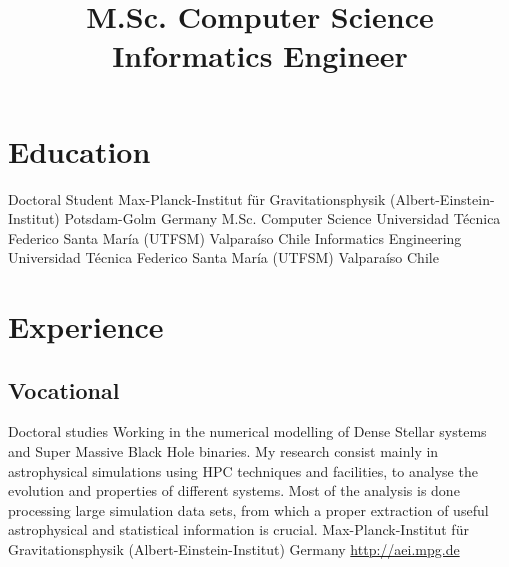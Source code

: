 \documentclass[12pt,a4paper]{moderncv}
\title{\Large M.Sc. Computer Science\newline
Informatics Engineer}
\newcommand{\utfsm}{Universidad Técnica Federico Santa María (UTFSM)}
\newcommand{\gray}{\textcolor{gray}}
\newcommand{\myurl}[1]{\gray{\url{#1}}}
\newcommand{\aei}{Max-Planck-Institut für Gravitationsphysik (Albert-Einstein-Institut)}
\newcommand{\cc}{\textcolor{color1}}
\begin{document}
\maketitle

\section{\LARGE Education}

\cventry{\cc{\textbf{2013 to\\ present}}}
        {Doctoral Student}
        {\aei}
        {}
        {Potsdam-Golm}
        {Germany}
        {M.Sc. Computer Science}
        {{\utfsm}}
        {}
        {Valparaíso}
        {Chile}
        {Informatics Engineering}
        {{\utfsm}}
        {}
        {Valparaíso}
        {Chile}


\section{\LARGE Experience}
\subsection{\Large Vocational}
\vspace{0.3cm}

        {Doctoral studies}
        {Working in the numerical modelling of \cc{Dense Stellar systems}
        and \cc{Super Massive Black Hole} binaries.\newline
        My research consist mainly in astrophysical simulations using \cc{HPC}
        techniques and facilities, to analyse the evolution and properties
        of different systems.\newline
        Most of the \cc{analysis} is done processing large simulation data sets,
        from which a proper extraction of useful astrophysical and statistical
        information is crucial.
        }
        {\aei}
        {Germany}
        {\myurl{http://aei.mpg.de}}
\end{document}
